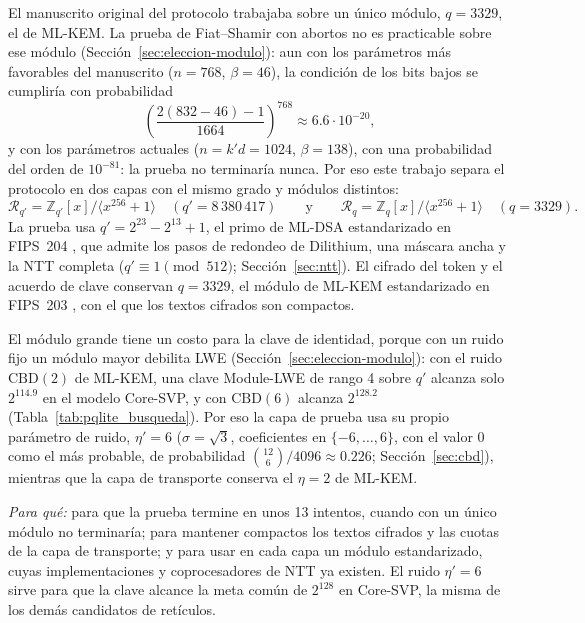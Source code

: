El manuscrito original del protocolo trabajaba sobre un único módulo, $q = 3329$, el de ML-KEM. La prueba de Fiat--Shamir con abortos no es practicable sobre ese módulo (Sección~\ref{sec:eleccion-modulo}): aun con los parámetros más favorables del manuscrito ($n = 768$, $\beta = 46$), la condición de los bits bajos se cumpliría con probabilidad
\begin{equation}
\left(\frac{2(832-46)-1}{1664}\right)^{768} \approx 6.6 \cdot 10^{-20},
\end{equation}
y con los parámetros actuales ($n = k'd = 1024$, $\beta = 138$), con una probabilidad del orden de $10^{-81}$: la prueba no terminaría nunca. Por eso este trabajo separa el protocolo en dos capas con el mismo grado y módulos distintos:
\begin{equation}
\mathcal{R}_{q'} = \mathbb{Z}_{q'}[x]/\langle x^{256} + 1 \rangle \quad (q' = 8\,380\,417) \qquad \text{y} \qquad \mathcal{R}_q = \mathbb{Z}_q[x]/\langle x^{256} + 1 \rangle \quad (q = 3329).
\end{equation}
La prueba usa $q' = 2^{23} - 2^{13} + 1$, el primo de ML-DSA estandarizado en FIPS~204 \cite{nist2024fips204, bai2021dilithium}, que admite los pasos de redondeo de Dilithium, una máscara ancha y la NTT completa ($q' \equiv 1 \pmod{512}$; Sección~\ref{sec:ntt}). El cifrado del token y el acuerdo de clave conservan $q = 3329$, el módulo de ML-KEM estandarizado en FIPS~203 \cite{nist2024fips203}, con el que los textos cifrados son compactos.

El módulo grande tiene un costo para la clave de identidad, porque con un ruido fijo un módulo mayor debilita LWE (Sección~\ref{sec:eleccion-modulo}): con el ruido $\mathrm{CBD}(2)$ de ML-KEM, una clave Module-LWE de rango 4 sobre $q'$ alcanza solo $2^{114.9}$ en el modelo Core-SVP, y con $\mathrm{CBD}(6)$ alcanza $2^{128.2}$ (Tabla~\ref{tab:pqlite_busqueda}). Por eso la capa de prueba usa su propio parámetro de ruido, $\eta' = 6$ ($\sigma = \sqrt{3}$, coeficientes en $\{-6, \dots, 6\}$, con el valor $0$ como el más probable, de probabilidad $\binom{12}{6}/4096 \approx 0.226$; Sección~\ref{sec:cbd}), mientras que la capa de transporte conserva el $\eta = 2$ de ML-KEM.

\textit{Para qué:} para que la prueba termine en unos 13 intentos, cuando con un único módulo no terminaría; para mantener compactos los textos cifrados y las cuotas de la capa de transporte; y para usar en cada capa un módulo estandarizado, cuyas implementaciones y coprocesadores de NTT ya existen. El ruido $\eta' = 6$ sirve para que la clave alcance la meta común de $2^{128}$ en Core-SVP, la misma de los demás candidatos de retículos.

